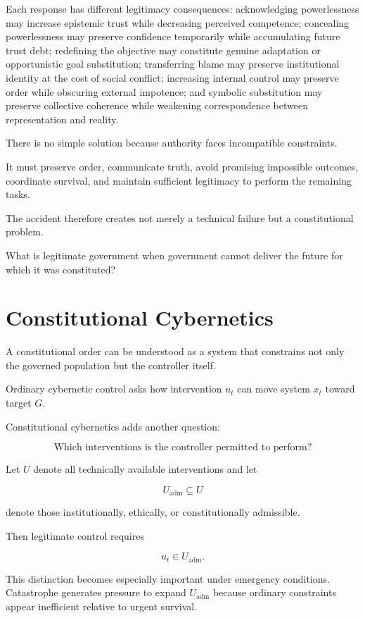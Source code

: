 \documentclass[11pt,oneside]{book}
\theoremstyle{definition}
\theoremstyle{remark}
\begin{document}
Each response has different legitimacy consequences: acknowledging powerlessness may increase epistemic trust while decreasing perceived competence; concealing powerlessness may preserve confidence temporarily while accumulating future trust debt; redefining the objective may constitute genuine adaptation or opportunistic goal substitution; transferring blame may preserve institutional identity at the cost of social conflict; increasing internal control may preserve order while obscuring external impotence; and symbolic substitution may preserve collective coherence while weakening correspondence between representation and reality.

There is no simple solution because authority faces incompatible constraints.

It must preserve order, communicate truth, avoid promising impossible outcomes, coordinate survival, and maintain sufficient legitimacy to perform the remaining tasks.

The accident therefore creates not merely a technical failure but a constitutional problem.

What is legitimate government when government cannot deliver the future for which it was constituted?

\section{Constitutional Cybernetics}

A constitutional order can be understood as a system that constrains not only the governed population but the controller itself.

Ordinary cybernetic control asks how intervention \(u_t\) can move system \(x_t\) toward target \(G\).

Constitutional cybernetics adds another question:

\[
\text{Which interventions is the controller permitted to perform?}
\]

Let \(U\) denote all technically available interventions and let

\[
U_{\mathrm{adm}}\subseteq U
\]

denote those institutionally, ethically, or constitutionally admissible.

Then legitimate control requires

\[
u_t\in U_{\mathrm{adm}}.
\]

This distinction becomes especially important under emergency conditions. Catastrophe generates pressure to expand \(U_{\mathrm{adm}}\) because ordinary constraints appear inefficient relative to urgent survival.
\end{document}
